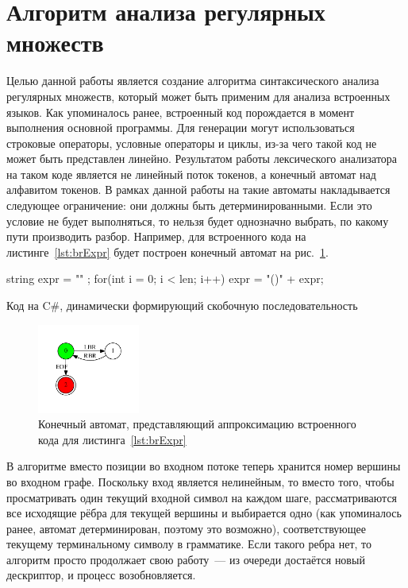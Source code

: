 \section{Алгоритм анализа регулярных множеств}
Целью данной работы является создание алгоритма синтаксического анализа регулярных множеств, который может быть применим для анализа встроенных языков. Как упоминалось ранее, встроенный код порождается в момент выполнения основной программы. Для генерации могут использоваться строковые операторы, условные операторы и циклы, из-за чего такой код не может быть представлен линейно. Результатом работы лексического анализатора на таком коде является не линейный поток токенов, а конечный автомат над алфавитом токенов. В рамках данной работы на такие автоматы накладывается следующее ограничение: они должны быть детерминированными. Если это условие не будет выполняться, то нельзя будет однозначно выбрать, по какому пути производить разбор. Например, для встроенного кода на листинге~\ref{lst:brExpr} будет построен конечный автомат на рис.~\ref{input}.

\begin{listing}
\begin{pyglist}[language=csharp,numbers=left,numbersep=5pt]
 string expr = "" ;
 for(int i = 0; i < len; i++) 
 {
     expr = "()" + expr;
 }
\end{pyglist}
\caption{Код на C\#, динамически формирующий скобочную последовательность}
\label{lst:brExpr}
\end{listing}

\begin{figure}[h]
 \centering
 \includegraphics[width=0.3\textwidth]{Ragozina/pics/input.pdf}
 \caption{Конечный автомат, представляющий аппроксимацию встроенного кода для листинга~\ref{lst:brExpr} }
 \label{input}
\end{figure}

В алгоритме вместо позиции во входном потоке теперь хранится номер вершины во входном графе. Поскольку вход является нелинейным, то вместо того, чтобы просматривать один текущий входной символ на каждом шаге, рассматриваются все исходящие рёбра для текущей вершины и выбирается одно (как упоминалось ранее, автомат детерминирован, поэтому это возможно), соответствующее текущему терминальному символу в грамматике. Если такого ребра нет, то алгоритм просто продолжает свою работу~--- из очереди достаётся новый дескриптор, и процесс возобновляется. 

